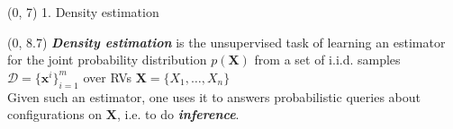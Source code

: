 \documentclass[final]{beamer}
\begin{document}
\begin{frame}{}
  
  
  \begin{textblock}{17.5}(0, 7)
    1. Density estimation
  \end{textblock}

  \begin{textblock}{17.5}(0, 8.7)
    \small
        \emph{\textbf{Density estimation}} is the unsupervised task of
    learning an estimator for the joint probability distribution
    $p(\mathbf{X})$ from a set of i.i.d. samples $\mathcal{D}=\{\mathbf
    x^i\}_{i=1}^m$ over RVs $\mathbf{X}=\{X_{1},\dots,X_{n}\}$\\[20pt]
    
    Given such an estimator, one uses it to answers
    probabilistic queries about configurations on $\mathbf{X}$,
    i.e. to do \emph{\textbf{inference}}.\\[20pt]


\end{textblock}
\end{frame}
\end{document}
